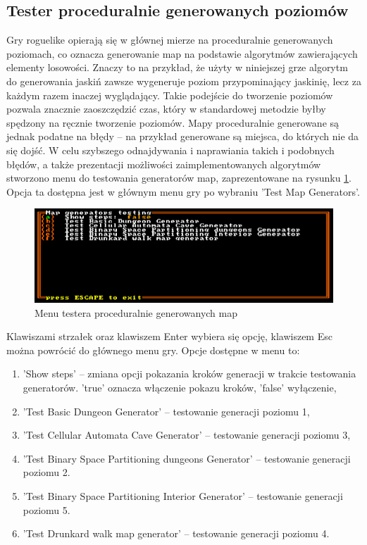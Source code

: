 \documentclass[12pt,twoside]{article}
\begin{document}
\subsection{Tester proceduralnie generowanych poziomów}
Gry roguelike opierają się w głównej mierze na proceduralnie generowanych poziomach, co oznacza generowanie map na podstawie algorytmów zawierających elementy losowości. Znaczy to na przykład, że użyty w niniejszej grze algorytm do generowania jaskiń zawsze wygeneruje poziom przypominający jaskinię, lecz za każdym razem inaczej wyglądający. Takie podejście do tworzenie poziomów pozwala znacznie zaoszczędzić czas, który w standardowej metodzie byłby spędzony na ręcznie tworzenie poziomów. Mapy proceduralnie generowane są jednak podatne na błędy -- na przykład generowane są miejsca, do których nie da się dojść. W celu szybszego odnajdywania i naprawiania takich i podobnych błędów, a także prezentacji możliwości zaimplementowanych algorytmów stworzono menu do testowania generatorów map, zaprezentowane na rysunku \ref{mygame:gen_test}. Opcja ta dostępna jest w głównym menu gry po wybraniu 'Test Map Generators'.

\FloatBarrier
\begin{figure}[h]
	\centering
	\includegraphics[width=14cm]{images/mygame/gen_test.png}
	\caption{Menu testera proceduralnie generowanych map}
	\label{mygame:gen_test}
\end{figure}
\FloatBarrier

Klawiszami strzałek oraz klawiszem Enter wybiera się opcję, klawiszem Esc można powrócić do głównego menu gry. Opcje dostępne w menu to:

\begin{enumerate}[label=\alph*), leftmargin=1.25cm]
	\item 'Show steps' -- zmiana opcji pokazania kroków generacji w trakcie testowania generatorów. 'true' oznacza włączenie pokazu kroków, 'false' wyłączenie,
	\item 'Test Basic Dungeon Generator' -- testowanie generacji poziomu 1,			
	\item 'Test Cellular Automata Cave Generator' -- testowanie generacji poziomu 3,
	\item 'Test Binary Space Partitioning dungeons Generator' -- testowanie generacji poziomu 2.
	\item 'Test Binary Space Partitioning Interior Generator' -- testowanie generacji poziomu 5.
	\item 'Test Drunkard walk map generator' -- testowanie generacji poziomu 4.
\end{enumerate}
\end{document}
